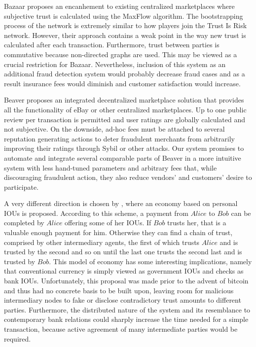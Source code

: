   Bazaar \cite{bazaar} proposes an encanhement to existing centralized marketplaces where subjective trust is calculated
  using the MaxFlow algorithm. The bootstrapping process of the network is extremely similar to how players join the Trust Is
  Risk network. However, their approach contains a weak point in the way new trust is calculated after each transaction.
  Furthermore, trust between parties is commutative because non-directed graphs are used. This may be viewed as a crucial
  restriction for Bazaar.  Nevertheless, inclusion of this system as an additional fraud detection system would probably
  decrease fraud cases and as a result insurance fees would diminish and customer satisfaction would increase.

  Beaver \cite{beaver} proposes an integrated decentralized marketplace solution that provides all the functionality of eBay
  or other centralized marketplaces. Up to one public review per transaction is permitted and user ratings are globally
  calculated and not subjective. On the downside, ad-hoc fees must be attached to several reputation generating actions to
  deter fraudulent merchants from arbitrarily improving their ratings through Sybil or other attacks. Our system promises to
  automate and integrate several comparable parts of Beaver in a more intuitive system with less hand-tuned parameters and
  arbitrary fees that, while discouraging fraudulent action, they also reduce vendors' and customers' desire to participate.

  A very different direction is chosen by \cite{iou}, where an economy based on personal IOUs is proposed. According to this
  scheme, a payment from $Alice$ to $Bob$ can be completed by $Alice$ offering some of her IOUs. If $Bob$ trusts her, that is
  a valuable enough payment for him. Otherwise they can find a chain of trust, comprised by other intermediary agents, the
  first of which trusts $Alice$ and is trusted by the second and so on until the last one trusts the second last and is
  trusted by $Bob$. This model of economy has some interesting implications, namely that conventional currency is simply
  viewed as government IOUs and checks as bank IOUs. Unfortunately, this proposal was made prior to the advent of bitcoin
  and thus had no concrete basis to be built upon, leaving room for malicious intermediary nodes to fake or disclose
  contradictory trust amounts to different parties. Furthermore, the distributed nature of the system and its resemblance to
  contemporary bank relations could sharply increase the time needed for a simple transaction, because active agreement of
  many intermediate parties would be required.

